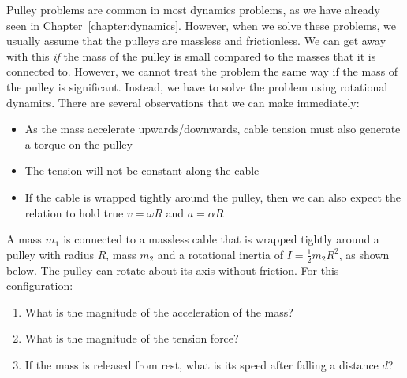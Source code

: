 Pulley problems are common in most dynamics problems, as we have already seen
in Chapter~\ref{chapter:dynamics}. However, when we solve these problems, we
usually assume that the pulleys are massless and frictionless. We can get away
with this \emph{if} the mass of the pulley is small compared to the masses
that it is connected to.
However, we cannot treat the problem the same way if the mass of the pulley is
significant. Instead, we have to solve the problem using rotational dynamics.
There are several observations that we can make immediately:
\begin{itemize}[itemsep=6pt]
\item As the mass accelerate upwards/downwards, cable tension must also
  generate a torque on the pulley
\item The tension will not be constant along the cable
\item If the cable is wrapped tightly around the pulley, then we can also
  expect the relation to hold true $v=\omega R$ and $a=\alpha R$
\end{itemize}
    
\begin{example}
  A mass $m_1$ is connected to a massless cable that is wrapped tightly around
  a pulley with radius $R$, mass $m_2$ and a rotational inertia of
  $I=\frac12m_2R^2$, as shown below. The pulley can rotate about its axis
  without friction. For this configuration:
  \begin{enumerate}[leftmargin=18pt,label=(\alph*)]
  \item What is the magnitude of the acceleration of the mass?
  \item What is the magnitude of the tension force?
  \item If the mass is released from rest, what is its speed after falling
    a distance $d$?
  \end{enumerate}
  \begin{center}
  \end{center}
\end{example}


